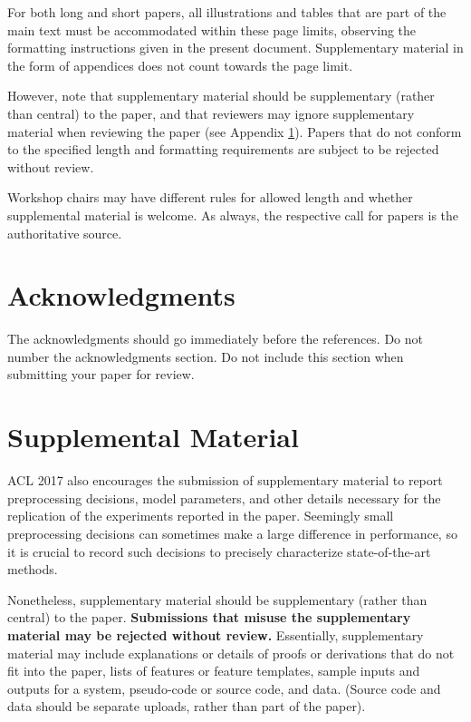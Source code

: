 \documentclass[11pt,a4paper]{article}
\begin{document}
For both long and short papers, all illustrations and tables that are part
of the main text must be accommodated within these page limits, observing
the formatting instructions given in the present document. Supplementary
material in the form of appendices does not count towards the page limit.

However, note that supplementary material should be supplementary
(rather than central) to the paper, and that reviewers may ignore
supplementary material when reviewing the paper (see Appendix
\ref{sec:supplemental}). Papers that do not conform to the specified
length and formatting requirements are subject to be rejected without
review.

Workshop chairs may have different rules for allowed length and
whether supplemental material is welcome. As always, the respective
call for papers is the authoritative source.

\section*{Acknowledgments}

The acknowledgments should go immediately before the references.  Do
not number the acknowledgments section. Do not include this section
when submitting your paper for review.

%
%



\appendix

\section{Supplemental Material}
\label{sec:supplemental}
ACL 2017 also encourages the submission of supplementary material
to report preprocessing decisions, model parameters, and other details
necessary for the replication of the experiments reported in the 
paper. Seemingly small preprocessing decisions can sometimes make
a large difference in performance, so it is crucial to record such
decisions to precisely characterize state-of-the-art methods.

Nonetheless, supplementary material should be supplementary (rather
than central) to the paper. {\bf Submissions that misuse the supplementary 
material may be rejected without review.}
Essentially, supplementary material may include explanations or details
of proofs or derivations that do not fit into the paper, lists of
features or feature templates, sample inputs and outputs for a system,
pseudo-code or source code, and data. (Source code and data should
be separate uploads, rather than part of the paper).
\end{document}
